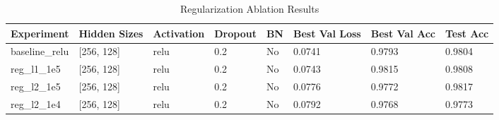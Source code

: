 \begin{table}[t]
    \centering
    \caption{Regularization Ablation Results}
    \label{tab:regularization_ablation}
    \begin{tabular}{llllllll}
        \toprule
        Experiment & Hidden Sizes & Activation & Dropout & BN & Best Val Loss & Best Val Acc & Test Acc \\
        \midrule
        baseline_relu & [256, 128] & relu & 0.2 & No & 0.0741 & 0.9793 & 0.9804 \\
        reg_l1_1e5 & [256, 128] & relu & 0.2 & No & 0.0743 & 0.9815 & 0.9808 \\
        reg_l2_1e5 & [256, 128] & relu & 0.2 & No & 0.0776 & 0.9772 & 0.9817 \\
        reg_l2_1e4 & [256, 128] & relu & 0.2 & No & 0.0792 & 0.9768 & 0.9773 \\
        \bottomrule
    \end{tabular}
\end{table}
